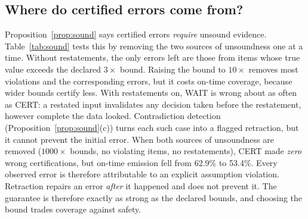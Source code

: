 \documentclass[conference]{IEEEtran}
\begin{document}
\subsection{Where do certified errors come from?}

Proposition~\ref{prop:sound} says certified errors \emph{require} unsound evidence. Table~\ref{tab:sound} tests this by
removing the two sources of unsoundness one at a time. Without restatements, the only errors left are those from
items whose true value exceeds the declared $3\times$ bound. Raising the bound to $10\times$ removes most violations
and the corresponding errors, but it costs on-time coverage, because wider bounds certify less. With restatements
on, WAIT is wrong about as often as CERT: a restated input invalidates any decision taken before the restatement,
however complete the data looked. Contradiction detection (Proposition~\ref{prop:sound}(c)) turns each such case into
a flagged retraction, but it cannot prevent the initial error. When both sources of unsoundness are removed ($1000\times$ bounds, no violating items, no restatements), CERT made
\emph{zero} wrong certifications, but on-time emission fell from 62.9\% to 53.4\%. Every observed error is therefore
attributable to an explicit assumption violation. Retraction repairs an error \emph{after} it happened and does not
prevent it. The guarantee is therefore exactly as strong as the declared bounds, and choosing the bound trades coverage
against safety.
\end{document}
